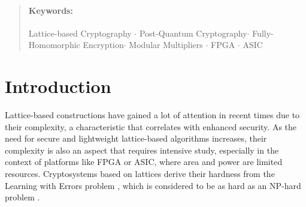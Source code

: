 \documentclass[11pt,
  titlepage=false,
  abstract=on,
]{scrreprt}
\begin{document}
\begin{abstract}



\paragraph*{Keywords:}
Lattice-based Cryptography $\cdot$
Post-Quantum Cryptography$\cdot$
Fully-Homomorphic Encryption$\cdot$
Modular Multipliers $\cdot$
FPGA $\cdot$
ASIC
\end{abstract}

\clearpage



\section{Introduction}
\label{sec:introduction}

Lattice-based constructions have gained a lot of attention in recent times due to their complexity, a characteristic that correlates with enhanced security.
As the need for secure and lightweight lattice-based algorithms increases, their complexity is also an aspect that requires intensive study, especially
in the context of platforms like FPGA or ASIC, where area and power are limited resources. Cryptosystems based on lattices derive their hardness from the
Learning with Errors problem \cite{regev2010learning}, which is considered to be as hard as an NP-hard problem \cite{micciancio2013hardness}.
\end{document}
